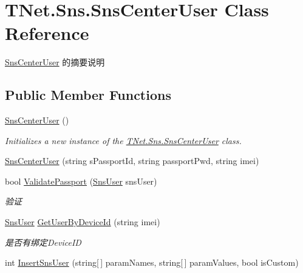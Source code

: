 \hypertarget{class_t_net_1_1_sns_1_1_sns_center_user}{}\section{T\+Net.\+Sns.\+Sns\+Center\+User Class Reference}
\label{class_t_net_1_1_sns_1_1_sns_center_user}


\mbox{\hyperlink{class_t_net_1_1_sns_1_1_sns_center_user}{Sns\+Center\+User}} 的摘要说明  


\subsection*{Public Member Functions}
\begin{DoxyCompactItemize}
\item 
\mbox{\hyperlink{class_t_net_1_1_sns_1_1_sns_center_user_aae47844f2311e542bfd6a8b20452c2b0}{Sns\+Center\+User}} ()
\begin{DoxyCompactList}\small\item\em Initializes a new instance of the \mbox{\hyperlink{class_t_net_1_1_sns_1_1_sns_center_user}{T\+Net.\+Sns.\+Sns\+Center\+User}} class. \end{DoxyCompactList}\item 
\mbox{\hyperlink{class_t_net_1_1_sns_1_1_sns_center_user_a090385842d9c88af0432eaacd61c0338}{Sns\+Center\+User}} (string s\+Passport\+Id, string passport\+Pwd, string imei)
\item 
bool \mbox{\hyperlink{class_t_net_1_1_sns_1_1_sns_center_user_a37ba1edc71233c8f87cd3aa8060ef750}{Validate\+Passport}} (\mbox{\hyperlink{class_t_net_1_1_sns_1_1_sns_user}{Sns\+User}} sns\+User)
\begin{DoxyCompactList}\small\item\em 验证 \end{DoxyCompactList}\item 
\mbox{\hyperlink{class_t_net_1_1_sns_1_1_sns_user}{Sns\+User}} \mbox{\hyperlink{class_t_net_1_1_sns_1_1_sns_center_user_a3485d2287fabece6bde73022df1b354d}{Get\+User\+By\+Device\+Id}} (string imei)
\begin{DoxyCompactList}\small\item\em 是否有绑定\+Device\+ID \end{DoxyCompactList}\item 
int \mbox{\hyperlink{class_t_net_1_1_sns_1_1_sns_center_user_a00e6fa5fc8a537ca1fcb0a5b115bb5ac}{Insert\+Sns\+User}} (string\mbox{[}$\,$\mbox{]} param\+Names, string\mbox{[}$\,$\mbox{]} param\+Values, bool is\+Custom)

\end{DoxyCompactItemize}

